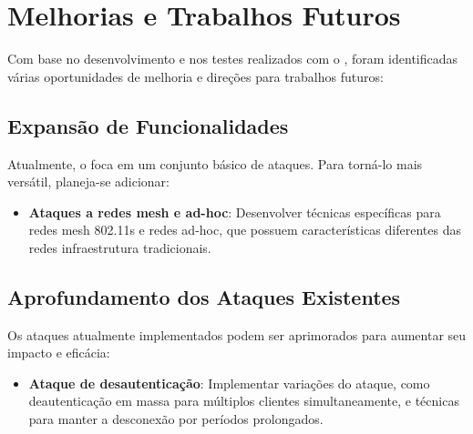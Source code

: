 \section{Melhorias e Trabalhos Futuros}

Com base no desenvolvimento e nos testes realizados com o \offscan, foram identificadas várias oportunidades de melhoria e direções para trabalhos futuros:



\subsection{\textbf{Expansão de Funcionalidades}}

Atualmente, o \offscan foca em um conjunto básico de ataques. Para torná-lo mais versátil, planeja-se adicionar:

\begin{itemize}
    \item \textbf{Ataques a redes mesh e ad-hoc}: Desenvolver técnicas específicas para redes mesh 802.11s e redes ad-hoc, que possuem características diferentes das redes infraestrutura tradicionais.
\end{itemize}



\subsection{\textbf{Aprofundamento dos Ataques Existentes}}

Os ataques atualmente implementados podem ser aprimorados para aumentar seu impacto e eficácia:

\begin{itemize}
    \item \textbf{Ataque de desautenticação}: Implementar variações do ataque, como deautenticação em massa para múltiplos clientes simultaneamente, e técnicas para manter a desconexão por períodos prolongados.
\end{itemize}
